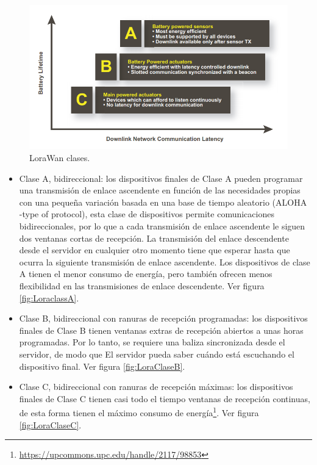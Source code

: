 \begin{figure}[h]
	\centering
	\includegraphics[scale=.45]{./Figures/Loracomparacionclases.PNG}
	\caption{LoraWan clases\protect\footnotemark. } %
	\label{fig:Loracomparacionclases}
\end{figure}

\begin{itemize}
    \item Clase A, bidireccional: los dispositivos finales de Clase A pueden programar una transmisión de enlace ascendente en función de las necesidades propias con una pequeña variación basada en una base de tiempo aleatorio (ALOHA -type of protocol), esta clase de dispositivos permite comunicaciones bidireccionales, por lo que a cada transmisión de enlace ascendente le siguen dos ventanas cortas de recepción. La transmisión del enlace descendente desde el servidor en cualquier otro momento tiene que esperar hasta que ocurra la siguiente transmisión de enlace ascendente. Los dispositivos de clase A tienen el menor consumo de energía, pero también ofrecen menos flexibilidad en las transmisiones de enlace descendente. Ver figura \ref{fig:LoraclassA}.

    \item Clase B, bidireccional con ranuras de recepción programadas: los dispositivos finales de Clase B  tienen ventanas extras de recepción  abiertos a unas horas programadas. Por lo tanto, se requiere una baliza sincronizada desde el servidor, de modo que
    El servidor pueda saber cuándo está escuchando el dispositivo final. Ver figura \ref{fig:LoraClaseB}.
    
    \item Clase C, bidireccional con ranuras de recepción máximas: los dispositivos finales de Clase C tienen casi todo el tiempo ventanas de recepción continuas, de esta forma tienen el máximo consumo de energía\protect\footnote{\label{note2}\url{https://upcommons.upc.edu/handle/2117/98853}}. Ver figura \ref{fig:LoraClaseC}. %
\end{itemize}


